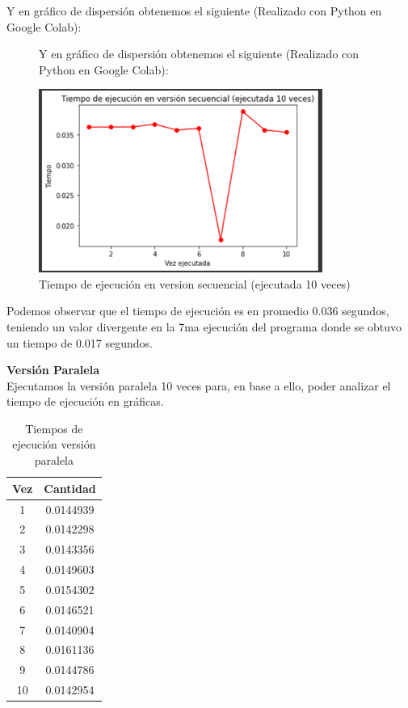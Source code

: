 \documentclass[12pt, letterpaper]{article}
\begin{document}
\begin{flushleft}
\end{flushleft}

\begin{flushleft}
    Y en gráfico de dispersión obtenemos el siguiente (Realizado con Python en Google Colab):

    \begin{figure}[H]
        \begin{flushleft}
            Y en gráfico de dispersión obtenemos el siguiente (Realizado con Python en Google Colab):
        \end{flushleft}
        \includegraphics[width=1\linewidth, height=6cm]{Imagen11} 
        \caption{Tiempo de ejecución en version secuencial (ejecutada 10 veces)}
    \end{figure}
        Podemos observar que el tiempo de ejecución es en promedio 0.036 segundos, teniendo un valor divergente en la 7ma ejecución del programa donde se obtuvo un tiempo de 0.017 segundos.
\end{flushleft}
\textbf{Versión Paralela}\\
Ejecutamos la versión paralela 10 veces para, en base a ello, poder analizar el tiempo de ejecución en gráficas.
\begin{table}[h]
    \begin{center}
        \begin{tabular}{| c | c |}
            \hline
            Vez & Cantidad \\ \hline
            1 & 0.0144939 \\\hline
            2 & 0.0142298 \\\hline
            3 & 0.0143356 \\ \hline
            4 & 0.0149603 \\ \hline
            5 & 0.0154302 \\ \hline
            6 & 0.0146521 \\ \hline
            7 & 0.0140904 \\ \hline
            8 & 0.0161136 \\ \hline
            9 & 0.0144786 \\ \hline
            10 & 0.0142954 \\ \hline
        \end{tabular}
        \caption{Tiempos de ejecución versión paralela}
        \label{tab:par}
    \end{center}
\end{table}
\end{document}
